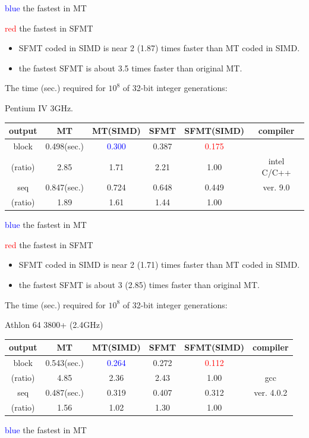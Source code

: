 \documentclass[a4j,12pt,landscape]{jarticle}
\begin{document}
\textcolor{blue}{blue} the fastest in MT

\textcolor{red}{red} the fastest in SFMT
\begin{itemize}
  \item SFMT coded in SIMD is near 2 (1.87) times faster than MT
 coded in SIMD.
  \item the fastest SFMT is about 3.5 times faster than original MT.
\end{itemize}
\newpage
\begin{center}
The time (sec.) required for $10^8$ 
of 32-bit integer generations:

Pentium IV 3GHz. 

\vskip 2mm
\begin{tabular}{|c||c|c|c|c|c|}
\hline
output & MT & MT{\Large(SIMD)} & SFMT & SFMT{\Large (SIMD)} & compiler
\\ \hline \hline
 block & 0.498(sec.) & \textcolor{blue}{0.300}
 & 0.387 & \textcolor{red}{0.175} & \\ \cline{2-5}
(ratio)& 2.85\phantom{0} & 1.71\phantom{0}  & 2.21\phantom{0}
  & 1.00\phantom{0}  & intel C/C++\\ \cline{1-5}
 seq   & 0.847(sec.) & 0.724 & 0.648 & 0.449 & ver. 9.0 \\\cline{2-5}
(ratio)& 1.89\phantom{0} & 1.61\phantom{0}  & 1.44\phantom{0}
  & 1.00\phantom{0}  &  \\ \hline
\end{tabular}
\end{center}
\textcolor{blue}{blue} the fastest in MT

\textcolor{red}{red} the fastest in SFMT
\begin{itemize}
  \item SFMT coded in SIMD is near 2 (1.71) times faster than MT
 coded in SIMD.
  \item the fastest SFMT is about 3 (2.85) times faster than original MT.
\end{itemize}

\newpage
\begin{center}
The time (sec.) required for $10^8$ 
of 32-bit integer generations:

Athlon 64 3800+ (2.4GHz)

\vskip 2mm
\begin{tabular}{|c||c|c|c|c|c|}
\hline
output & MT & MT{\Large(SIMD)} & SFMT & SFMT{\Large (SIMD)} & compiler
\\ \hline \hline
block & 0.543(sec.) & \textcolor{blue}{0.264}
 & 0.272 & \textcolor{red}{0.112} & \phantom{intel C/C++}\\
 \cline{2-5}
(ratio)& 4.85\phantom{0} & 2.36\phantom{0}  & 2.43\phantom{0} & 1.00\phantom{0} & gcc \\ \cline{1-5}
seq & 0.487(sec.) & 0.319 & 0.407 & 0.312 & ver. 4.0.2\\ \cline{2-5}
(ratio)& 1.56\phantom{0} & 1.02\phantom{0}  & 1.30\phantom{0} & 1.00\phantom{0} & \\ \hline
\end{tabular}
\end{center}
\textcolor{blue}{blue} the fastest in MT
\end{document}
